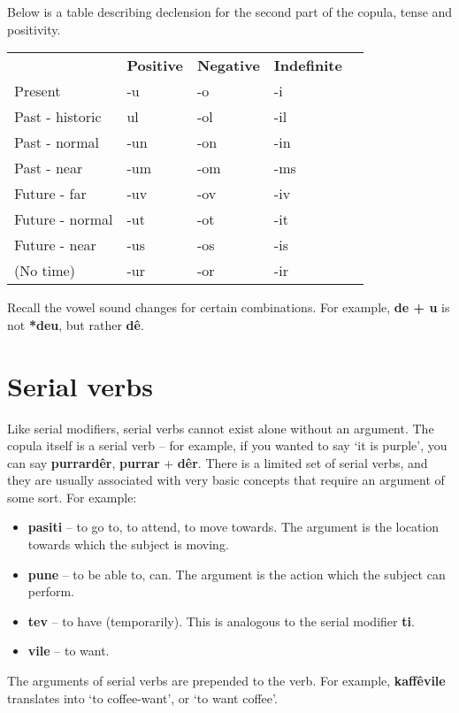 \documentclass[12pt]{report}
\begin{document}
\vspace{5mm}
Below is a table describing declension for the second part of the copula, tense and positivity.
\vspace{5mm}

\begin{tabular}{l | l | l | l | l}
  & \textbf{Positive} &  \textbf{Negative} & \textbf{Indefinite} \\
Present & -u & -o& -i\\
Past - historic & ul&-ol&-il \\
Past - normal &-un& -on& -in\\
Past - near &-um&  -om&-ms\\
Future - far &  -uv&  -ov& -iv\\
Future - normal &-ut&  -ot&-it\\
Future - near &  -us & -os& -is\\
(No time)  & -ur & -or & -ir\\
\end{tabular}

\vspace{5mm}
Recall the vowel sound changes for certain combinations. For example, \textbf{de + u} is not \textbf{*deu}, but rather \textbf{d\^e}.

\section{Serial verbs}
Like serial modifiers, serial verbs cannot exist alone without an argument. The copula itself is a serial verb -- for example, if you wanted to say `it is purple', you can say \textbf{purrard\^er}, \textbf{purrar} + \textbf{d\^er}. There is a limited set of serial verbs, and they are usually associated with very basic concepts that require an argument of some sort. For example:

\begin{itemize}
\item \textbf{pasiti} -- to go to, to attend, to move towards. The argument is the location towards which the subject is moving.
\item \textbf{pune} -- to be able to, can. The argument is the action which the subject can perform.
\item \textbf{tev} -- to have (temporarily). This is analogous to the serial modifier \textbf{ti}. 
\item \textbf{vile} -- to want.
\end{itemize}

The arguments of serial verbs are prepended to the verb. For example, \textbf{kaff\^evile} translates into `to coffee-want', or `to want coffee'. 
\end{document}
